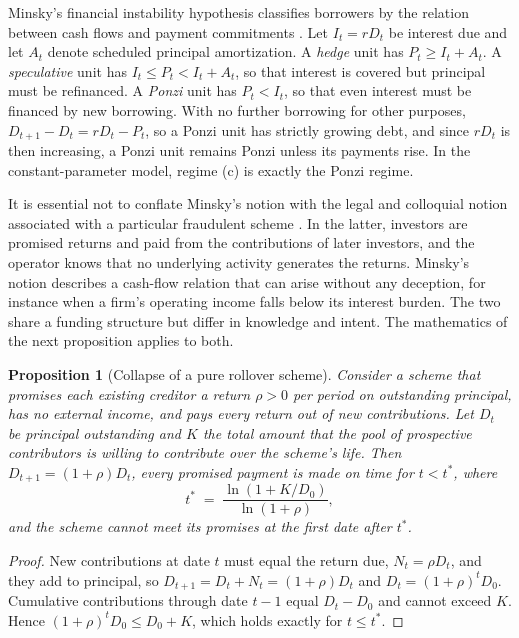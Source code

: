 \documentclass[11pt]{article}
\newtheorem{proposition}[theorem]{Proposition}
\theoremstyle{definition}
\theoremstyle{remark}
\begin{document}
Minsky's financial instability hypothesis classifies borrowers by the relation between cash flows and payment commitments \cite{minsky1986}. Let $I_t=r D_t$ be interest due and let $A_t$ denote scheduled principal amortization. A \emph{hedge} unit has $P_t\ge I_t+A_t$. A \emph{speculative} unit has $I_t\le P_t<I_t+A_t$, so that interest is covered but principal must be refinanced. A \emph{Ponzi} unit has $P_t<I_t$, so that even interest must be financed by new borrowing. With no further borrowing for other purposes, $D_{t+1}-D_t=rD_t-P_t$, so a Ponzi unit has strictly growing debt, and since $rD_t$ is then increasing, a Ponzi unit remains Ponzi unless its payments rise. In the constant-parameter model, regime (c) is exactly the Ponzi regime.

It is essential not to conflate Minsky's notion with the legal and colloquial notion associated with a particular fraudulent scheme \cite{cunningham1924}. In the latter, investors are promised returns and paid from the contributions of later investors, and the operator knows that no underlying activity generates the returns. Minsky's notion describes a cash-flow relation that can arise without any deception, for instance when a firm's operating income falls below its interest burden. The two share a funding structure but differ in knowledge and intent. The mathematics of the next proposition applies to both.

\begin{proposition}[Collapse of a pure rollover scheme]\label{prop:rollover}
Consider a scheme that promises each existing creditor a return $\rho>0$ per period on outstanding principal, has no external income, and pays every return out of new contributions. Let $D_t$ be principal outstanding and $K$ the total amount that the pool of prospective contributors is willing to contribute over the scheme's life. Then $D_{t+1}=(1+\rho)D_t$, every promised payment is made on time for $t<t^\ast$, where
\[
t^\ast \;=\; \frac{\ln(1+K/D_0)}{\ln(1+\rho)},
\]
and the scheme cannot meet its promises at the first date after $t^\ast$.
\end{proposition}

\begin{proof}
New contributions at date $t$ must equal the return due, $N_t=\rho D_t$, and they add to principal, so $D_{t+1}=D_t+N_t=(1+\rho)D_t$ and $D_t=(1+\rho)^tD_0$. Cumulative contributions through date $t-1$ equal $D_t-D_0$ and cannot exceed $K$. Hence $(1+\rho)^tD_0\le D_0+K$, which holds exactly for $t\le t^\ast$.
\end{proof}
\end{document}
